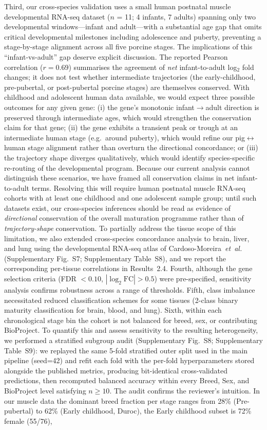 \documentclass[10pt,a4paper]{article}
\begin{document}
Third, our cross-species validation uses a small human postnatal muscle developmental RNA-seq dataset ($n$ = 11; 4 infants, 7 adults) spanning only two developmental windows---infant and adult---with a substantial age gap that omits critical developmental milestones including adolescence and puberty, preventing a stage-by-stage alignment across all five porcine stages. The implications of this ``infant-vs-adult'' gap deserve explicit discussion. The reported Pearson correlation ($r = 0.69$) summarises the agreement of \emph{net} infant-to-adult log$_2$ fold changes; it does not test whether intermediate trajectories (the early-childhood, pre-pubertal, or post-pubertal porcine stages) are themselves conserved. With childhood and adolescent human data available, we would expect three possible outcomes for any given gene: (i) the gene's monotonic infant$\to$adult direction is preserved through intermediate ages, which would strengthen the conservation claim for that gene; (ii) the gene exhibits a transient peak or trough at an intermediate human stage (e.g.\ around puberty), which would refine our pig$\leftrightarrow$human stage alignment rather than overturn the directional concordance; or (iii) the trajectory shape diverges qualitatively, which would identify species-specific re-routing of the developmental program. Because our current analysis cannot distinguish these scenarios, we have framed all conservation claims in net infant-to-adult terms. Resolving this will require human postnatal muscle RNA-seq cohorts with at least one childhood and one adolescent sample group; until such datasets exist, our cross-species inferences should be read as evidence of \emph{directional} conservation of the overall maturation programme rather than of \emph{trajectory-shape} conservation. To partially address the tissue scope of this limitation, we also extended cross-species concordance analysis to brain, liver, and lung using the developmental RNA-seq atlas of Cardoso-Moreira~\textit{et~al.}\cite{cardoso-moreira_gene_2019} (Supplementary Fig.~S7; Supplementary Table~S8), and we report the corresponding per-tissue correlations in Results~2.4. Fourth, although the gene selection criteria (FDR $< 0.10$, $|\log_2\mathrm{FC}| > 0.5$) were pre-specified, sensitivity analysis confirms robustness across a range of thresholds. Fifth, class imbalance necessitated reduced classification schemes for some tissues (2-class binary maturity classification for brain, blood, and lung). Sixth, within each chronological stage bin the cohort is not balanced for breed, sex, or contributing BioProject. To quantify this and assess sensitivity to the resulting heterogeneity, we performed a stratified subgroup audit (Supplementary Fig.~S8; Supplementary Table~S9): we replayed the same 5-fold stratified outer split used in the main pipeline (seed=42) and refit each fold with the per-fold hyperparameters stored alongside the published metrics, producing bit-identical cross-validated predictions, then recomputed balanced accuracy within every Breed, Sex, and BioProject level satisfying $n \geq 10$. The audit confirms the reviewer's intuition. In our muscle data the dominant breed fraction per stage ranges from 28\% (Pre-pubertal) to 62\% (Early childhood, Duroc), the Early childhood subset is 72\% female (55/76), 
\end{document}

